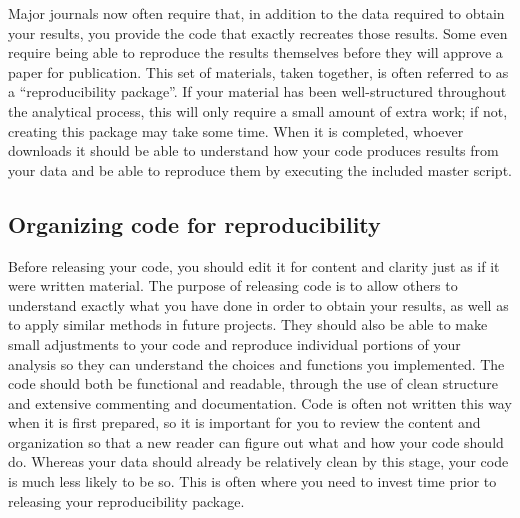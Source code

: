 Major journals now often require that,
in addition to the data required to obtain your results,
you provide the code that exactly recreates those results.
Some even require being able to reproduce the results themselves
before they will approve a paper for publication.
This set of materials, taken together,
is often referred to as a ``reproducibility package''.
If your material has been well-structured throughout the analytical process,
this will only require a small amount of extra work;
if not, creating this package may take some time.
When it is completed,
whoever downloads it should be able
to understand how your code produces results from your data
and be able to reproduce them by executing the included master script.

\subsection{Organizing code for reproducibility}

Before releasing your code, you should edit it for content and clarity
just as if it were written material.
The purpose of releasing code is to allow others to understand
exactly what you have done in order to obtain your results,
as well as to apply similar methods in future projects.
They should also be able to make small adjustments to your code
and reproduce individual portions of your analysis
so they can understand the choices and functions you implemented.
The code should both be functional and readable,
through the use of clean structure and extensive commenting and documentation.
Code is often not written this way when it is first prepared,
so it is important for you to review the content and organization
so that a new reader can figure out what and how your code should do.
Whereas your data should already be relatively clean by this stage,
your code is much less likely to be so.
This is often where you need to invest time prior to releasing your reproducibility package.

